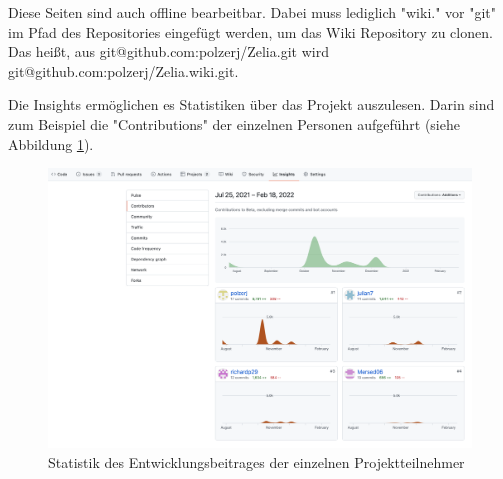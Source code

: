 Diese Seiten sind auch offline bearbeitbar. Dabei muss lediglich "wiki." vor "git" im Pfad des Repositories eingefügt werden, um das Wiki Repository zu clonen. Das heißt, aus {\ttfamily git@github.com:polzerj/Zelia.git} wird\\ {\ttfamily git@github.com:polzerj/Zelia.wiki.git}. 


Die Insights ermöglichen es Statistiken über das Projekt auszulesen. Darin sind zum Beispiel die "Contributions" der einzelnen Personen aufgeführt (siehe Abbildung \ref{fig:insights}).

\begin{figure}[H]
    \centering
    \includegraphics[width=\textwidth]{media/ProjectManagement/Insights.png}
    \caption{Statistik des Entwicklungsbeitrages der einzelnen Projektteilnehmer}
    \label{fig:insights}
\end{figure}
